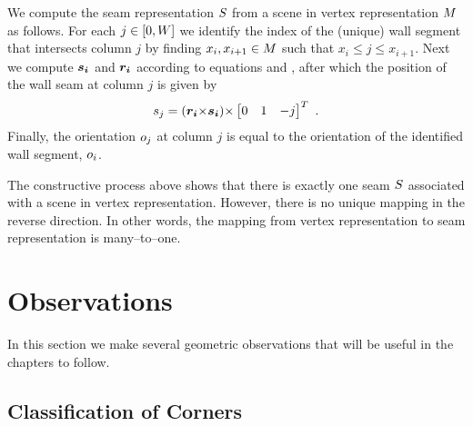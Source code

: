 We compute the seam representation $\Seam$ from a scene in vertex
representation $\Scene$ as follows. For each $j\in[0,\Width]$ we
identify the index of the (unique) wall segment that intersects column
$j$ by finding $x_i,x_{i+1}\in\Scene$ such that $x_i \leq j \leq
x_{i+1}$. Next we compute $\vect{s_i}$ and $\vect{r_i}$ according to
equations  and , after which the position of the
wall seam at column $j$ is given by
\begin{equation}
  \label{eq:seam-from-scene}
  \seam_j = (\vect{r_i} \cross \vect{s_i}) \cross
  \begin{bmatrix} 0 & 1 & -j \end{bmatrix}^T ~.
\end{equation}
Finally, the orientation $\WallOrient_j$ at column $j$ is equal to the
orientation of the identified wall segment, $\WallOrient_i$.

The constructive process above shows that there is exactly one seam
$\Seam$ associated with a scene in vertex
representation. However, there is no unique mapping in the reverse
direction. In other words, the mapping from vertex representation to
seam representation is many--to--one.

\section{Observations}

In this section we make several geometric observations that will be
useful in the chapters to follow.

\subsection{Classification of Corners}
\label{sec:corner-categories}


